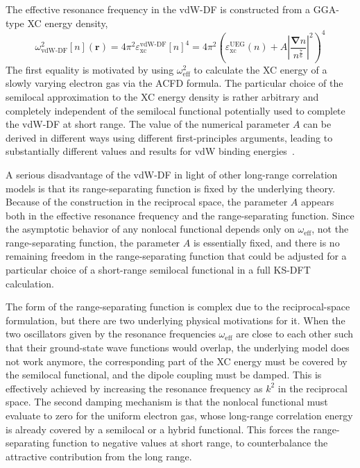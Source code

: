 The effective resonance frequency in the vdW-DF is constructed from a GGA-type XC energy density,
\begin{equation}
\omega^2_\text{vdW-DF}[n](\mathbf r)=4\pi^2\varepsilon_\text{xc}^\text{vdW-DF}[n]^4
  =4\pi^2\left(
      \varepsilon_\text{xc}^\text{UEG}(n)
      +A\left\lvert\frac{\mathbf\nabla n}{n^\frac76}\right\rvert^2
      \right)^4
\end{equation}
The first equality is motivated by using $\omega^2_\text{eff}$ to calculate the XC energy of a slowly varying electron gas via the ACFD formula.
The particular choice of the semilocal approximation to the XC energy density is rather arbitrary and completely independent of the semilocal functional potentially used to complete the vdW-DF at short range.
The value of the numerical parameter $A$ can be derived in different ways using different first-principles arguments, leading to substantially different values and results for vdW binding energies~\cite{LeePRB10}.

A serious disadvantage of the vdW-DF in light of other long-range correlation models is that its range-separating function is fixed by the underlying theory.
Because of the construction in the reciprocal space, the parameter $A$ appears both in the effective resonance frequency and the range-separating function.
Since the asymptotic behavior of any nonlocal functional depends only on $\omega_\text{eff}$, not the range-separating function, the parameter $A$ is essentially fixed, and there is no remaining freedom in the range-separating function that could be adjusted for a particular choice of a short-range semilocal functional in a full KS-DFT calculation.

The form of the range-separating function is complex due to the reciprocal-space formulation, but there are two underlying physical motivations for it.
When the two oscillators given by the resonance frequencies $\omega_\text{eff}$ are close to each other such that their ground-state wave functions would overlap, the underlying model does not work anymore, the corresponding part of the XC energy must be covered by the semilocal functional, and the dipole coupling must be damped.
This is effectively achieved by increasing the resonance frequency as $k^2$ in the reciprocal space.
The second damping mechanism is that the nonlocal functional must evaluate to zero for the uniform electron gas, whose long-range correlation energy is already covered by a semilocal or a hybrid functional.
This forces the range-separating function to negative values at short range, to counterbalance the attractive contribution from the long range.

